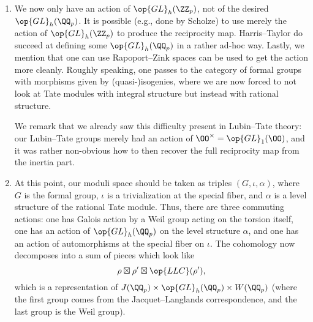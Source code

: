 \documentclass[../notes.tex]{subfiles}
\begin{document}
\begin{enumerate}[label=(\roman*), resume]
	\item We now only have an action of $\op{GL}_h(\ZZ_p)$, not of the desired $\op{GL}_h(\QQ_p)$. It is possible (e.g., done by Scholze) to use merely the action of $\op{GL}_h(\ZZ_p)$ to produce the reciprocity map. Harris--Taylor do succeed at defining some $\op{GL}_h(\QQ_p)$ in a rather ad-hoc way. Lastly, we mention that one can use Rapoport--Zink spaces can be used to get the action more cleanly. Roughly speaking, one passes to the category of formal groups with morphisms given by (quasi-)isogenies, where we are now forced to not look at Tate modules with integral structure but instead with rational structure.

	We remark that we already saw this difficulty present in Lubin--Tate theory: our Lubin--Tate groups merely had an action of $\OO^\times=\op{GL}_1(\OO)$, and it was rather non-obvious how to then recover the full reciprocity map from the inertia part.

	\item At this point, our moduli space should be taken as triples $(G,\iota,\alpha)$, where $G$ is the formal group, $\iota$ is a trivialization at the special fiber, and $\alpha$ is a level structure of the rational Tate module. Thus, there are three commuting actions: one has  Galois action by a Weil group acting on the torsion itself, one has an action of $\op{GL}_h(\QQ_p)$ on the level structure $\alpha$, and one has an action of automorphisms at the special fiber on $\iota$. The cohomology now decomposes into a sum of pieces which look like
	\[\rho\boxtimes\rho'\boxtimes\op{LLC}(\rho'),\]
	which is a representation of $J(\QQ_p)\times\op{GL}_h(\QQ_p)\times W(\QQ_p)$ (where the first group comes from the Jacquet--Langlands correspondence, and the last group is the Weil group).
\end{enumerate}
\end{document}
